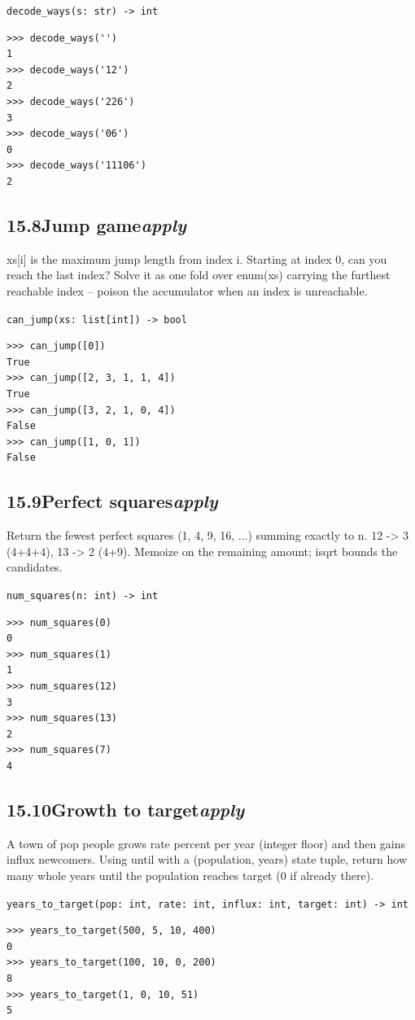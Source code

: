 \documentclass[10pt,letterpaper]{book}
\begin{document}
\noindent\texttt{decode\_ways(s: str) -> int}
\begin{lstlisting}[style=ex]
>>> decode_ways('')
1
>>> decode_ways('12')
2
>>> decode_ways('226')
3
>>> decode_ways('06')
0
>>> decode_ways('11106')
2
\end{lstlisting}
\subsection*{15.8\quad Jump game\hfill\textnormal{\textit{apply}}}
xs[i] is the maximum jump length from index i. Starting at index 0, can you reach the last index? Solve it as one fold over enum(xs) carrying the furthest reachable index -- poison the accumulator when an index is unreachable.

\noindent\texttt{can\_jump(xs: list[int]) -> bool}
\begin{lstlisting}[style=ex]
>>> can_jump([0])
True
>>> can_jump([2, 3, 1, 1, 4])
True
>>> can_jump([3, 2, 1, 0, 4])
False
>>> can_jump([1, 0, 1])
False
\end{lstlisting}
\subsection*{15.9\quad Perfect squares\hfill\textnormal{\textit{apply}}}
Return the fewest perfect squares (1, 4, 9, 16, ...) summing exactly to n. 12 -> 3 (4+4+4), 13 -> 2 (4+9). Memoize on the remaining amount; isqrt bounds the candidates.

\noindent\texttt{num\_squares(n: int) -> int}
\begin{lstlisting}[style=ex]
>>> num_squares(0)
0
>>> num_squares(1)
1
>>> num_squares(12)
3
>>> num_squares(13)
2
>>> num_squares(7)
4
\end{lstlisting}
\subsection*{15.10\quad Growth to target\hfill\textnormal{\textit{apply}}}
A town of pop people grows rate percent per year (integer floor) and then gains influx newcomers. Using until with a (population, years) state tuple, return how many whole years until the population reaches target (0 if already there).

\noindent\texttt{years\_to\_target(pop: int, rate: int, influx: int, target: int) -> int}
\begin{lstlisting}[style=ex]
>>> years_to_target(500, 5, 10, 400)
0
>>> years_to_target(100, 10, 0, 200)
8
>>> years_to_target(1, 0, 10, 51)
5
\end{lstlisting}
\end{document}
